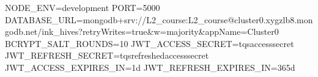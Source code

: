 NODE_ENV=development
PORT=5000
DATABASE_URL=mongodb+srv://L2_course:L2_course@cluster0.xygzlb8.mongodb.net/ink_hives?retryWrites=true&w=majority&appName=Cluster0
BCRYPT_SALT_ROUNDS=10
JWT_ACCESS_SECRET=tqsaccesssecret
JWT_REFRESH_SECRET=tqsrefreshedaccesssecret
JWT_ACCESS_EXPIRES_IN=1d
JWT_REFRESH_EXPIRES_IN=365d